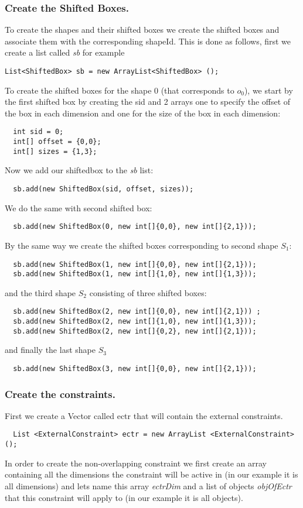 \subsubsection{Create the Shifted Boxes.}\label{geostdescription:createtheshiftedboxes}\hypertarget{geostdescription:createtheshiftedboxes}{}
To create the shapes and their shifted boxes we create the shifted boxes and associate them with the corresponding shapeId. This is done as follows, first we create a list called \emph{sb} for example 
\begin{lstlisting}
List<ShiftedBox> sb = new ArrayList<ShiftedBox> ();
\end{lstlisting}
To create the shifted boxes for the shape 0 (that corresponds to $o_0$), we start by the first shifted box by creating the sid and 2 arrays one to specify the offset of the box in each dimension and one for the size of the box in each dimension:
\begin{lstlisting}
  int sid = 0; 
  int[] offset = {0,0};
  int[] sizes = {1,3};
\end{lstlisting} 
Now we add our shiftedbox to the \emph{sb} list:
\begin{lstlisting}
  sb.add(new ShiftedBox(sid, offset, sizes));
\end{lstlisting} 
We do the same with second shifted box:
\begin{lstlisting}
  sb.add(new ShiftedBox(0, new int[]{0,0}, new int[]{2,1}));
\end{lstlisting} 
By the same way we create the shifted boxes corresponding to second shape $S_1$:
\begin{lstlisting}
  sb.add(new ShiftedBox(1, new int[]{0,0}, new int[]{2,1}));
  sb.add(new ShiftedBox(1, new int[]{1,0}, new int[]{1,3}));
\end{lstlisting}
and the third shape $S_2$ consisting of three shifted boxes:
\begin{lstlisting}
  sb.add(new ShiftedBox(2, new int[]{0,0}, new int[]{2,1})) ;
  sb.add(new ShiftedBox(2, new int[]{1,0}, new int[]{1,3})); 
  sb.add(new ShiftedBox(2, new int[]{0,2}, new int[]{2,1}));
\end{lstlisting}
and finally the last shape $S_3$
\begin{lstlisting}
  sb.add(new ShiftedBox(3, new int[]{0,0}, new int[]{2,1}));
\end{lstlisting}

\subsubsection{Create the constraints.}\label{geostdescription:createtheconstraints}\hypertarget{geostdescription:createtheconstraints}{}
First we create a Vector called ectr that will contain the external constraints. 
\begin{lstlisting}
  List <ExternalConstraint> ectr = new ArrayList <ExternalConstraint>();
\end{lstlisting}
In order to create the non-overlapping constraint we first create an array containing all the dimensions the constraint will be active in (in our example it is all dimensions) and lets name this array \emph{ectrDim} and a list of objects \emph{objOfEctr} that this constraint will apply to (in our example it is all objects).

